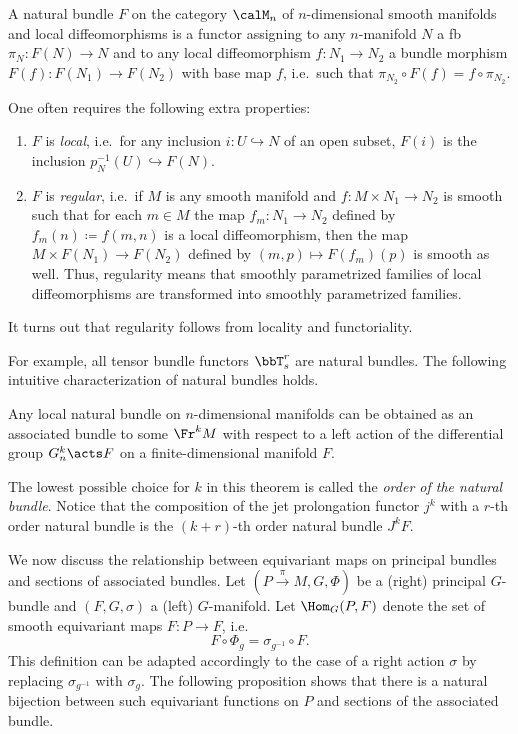 \begin{defn}
    A natural bundle $F$ on the category $\calM_n$ of $n$-dimensional smooth manifolds and local diffeomorphisms is a functor assigning to any $n$-manifold $N$ a \gls{fb} $\pi_N:F(N)\to N$ and to any local diffeomorphism $f:N_1\to N_2$ a bundle morphism $F(f):F(N_1)\to F(N_2)$ with base map $f$, i.e.\ such that $\pi_{N_2}\circ F(f)=f\circ \pi_{N_2}$. 

    One often requires the following extra properties:
    \begin{enumerate}[label=(\alph*)]
        \item $F$ is \emph{local}, i.e.\ for any inclusion $i:U\hookrightarrow N$ of an open subset, $F(i)$ is the inclusion $p^{-1}_N(U)\hookrightarrow F(N)$.
    
        \item $F$ is \emph{regular}, i.e.\ if $M$ is any smooth manifold and $f:M\times N_1\to N_2$ is smooth such that for each $m\in M$ the map $f_m:N_1\to N_2$ defined by $f_m(n)\coloneqq f(m,n)$ is a local diffeomorphism, then the map $M\times F(N_1)\to F(N_2)$ defined by $(m,p)\mapsto F(f_m)(p)$ is smooth as well. Thus, regularity means that smoothly parametrized families of local diffeomorphisms are transformed into smoothly parametrized families.
    \end{enumerate}
    It turns out that regularity follows from locality and functoriality.
\end{defn}

For example, all tensor bundle functors $\bbT^r_s$ are natural bundles. The following intuitive characterization of natural bundles holds.

\begin{thm}
    Any local natural bundle on $n$-dimensional manifolds can be obtained as an associated bundle to some $\Fr^k M$ with respect to a left action of the differential group $G^k_n\acts F$ on a finite-dimensional manifold $F$.
\end{thm}

The lowest possible choice for $k$ in this theorem is called the \emph{order of the natural bundle}. Notice that the composition of the jet prolongation functor $j^k$ with a $r$-th order natural bundle is the $(k+r)$-th order natural bundle $J^k F$.




We now discuss the relationship between equivariant maps on principal bundles and sections of associated bundles. Let $(P\overset{\pi}{\to}M,G,\Phi)$ be a (right) principal $G$-bundle and $(F,G,\sigma)$ a (left) $G$-manifold. Let $\Hom_G(P,F)$ denote the set of smooth equivariant maps $F:P\to F$, i.e.
\[F\circ \Phi_g=\sigma_{g^{-1}}\circ F.\label{eq 1.2.9 RS2}\]
This definition can be adapted accordingly to the case of a right action $\sigma$ by replacing $\sigma_{g^{-1}}$ with $\sigma_g$. The following proposition shows that there is a natural bijection between such equivariant functions on $P$ and sections of the associated bundle.

